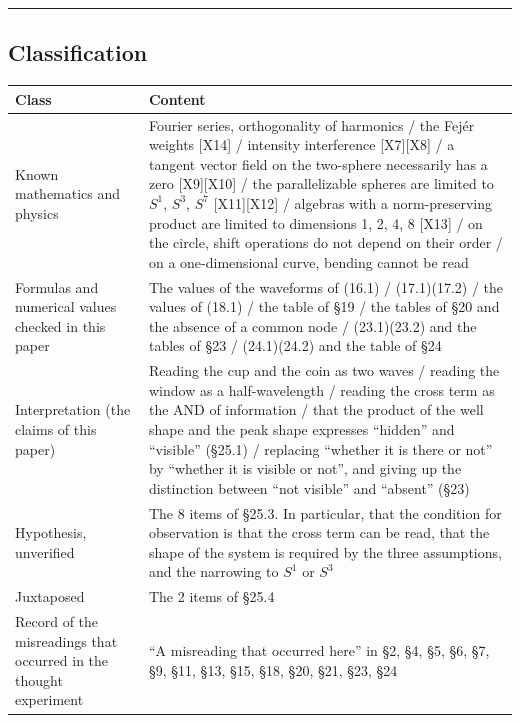 \documentclass[
  a4paper,
]{article}
\newcounter{none} %
\begin{document}
\begin{center}\rule{0.5\linewidth}{0.5pt}\end{center}

\subsection{Classification}\label{classification}

{\def\LTcaptype{none} %
\begin{longtable}[]{@{}
  >{\raggedright\arraybackslash}p{}
  >{\raggedright\arraybackslash}p{}@{}}
\toprule\noalign{}
\begin{minipage}[b]{\linewidth}\raggedright
Class
\end{minipage} & \begin{minipage}[b]{\linewidth}\raggedright
Content
\end{minipage} \\
\midrule\noalign{}
\endhead
\bottomrule\noalign{}
\endlastfoot
Known mathematics and physics & Fourier series, orthogonality of
harmonics / the Fejér weights {[}X14{]} / intensity interference
{[}X7{]}{[}X8{]} / a tangent vector field on the two-sphere necessarily
has a zero {[}X9{]}{[}X10{]} / the parallelizable spheres are limited to
\(S^1\), \(S^3\), \(S^7\) {[}X11{]}{[}X12{]} / algebras with a
norm-preserving product are limited to dimensions 1, 2, 4, 8 {[}X13{]} /
on the circle, shift operations do not depend on their order / on a
one-dimensional curve, bending cannot be read \\
Formulas and numerical values checked in this paper & The values of the
waveforms of (16.1) / (17.1)(17.2) / the values of (18.1) / the table of
§19 / the tables of §20 and the absence of a common node / (23.1)(23.2)
and the tables of §23 / (24.1)(24.2) and the table of §24 \\
Interpretation (the claims of this paper) & Reading the cup and the coin
as two waves / reading the window as a half-wavelength / reading the
cross term as the AND of information / that the product of the well
shape and the peak shape expresses ``hidden'' and ``visible'' (§25.1) /
replacing ``whether it is there or not'' by ``whether it is visible or
not'', and giving up the distinction between ``not visible'' and
``absent'' (§23) \\
Hypothesis, unverified & The 8 items of §25.3. In particular, that the
condition for observation is that the cross term can be read, that the
shape of the system is required by the three assumptions, and the
narrowing to \(S^1\) or \(S^3\) \\
Juxtaposed & The 2 items of §25.4 \\
Record of the misreadings that occurred in the thought experiment & ``A
misreading that occurred here'' in §2, §4, §5, §6, §7, §9, §11, §13,
§15, §18, §20, §21, §23, §24 \\
\end{longtable}
}
\end{document}

